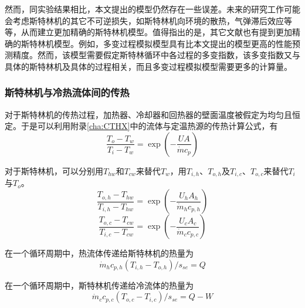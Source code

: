 然而，同实验结果相比，本文提出的模型仍然存在一些误差。未来的研究工作可能会考虑斯特林机的其它不可逆损失，如斯特林机向环境的散热，气弹滞后效应等等，从而建立更加精确的斯特林机模型。值得指出的是，其它文献也有提到更加精确的斯特林机模型。例如，多变过程模拟模型具有比本文提出的模型更高的性能预测精度\cite{Hosseinzade2015, Babaelahi2015}。然而，该模型需要假定斯特林循环中各过程的多变指数，该多变指数又与具体的斯特林机及具体的过程相关，而且多变过程模拟模型需要更多的计算量。

\subsubsection{斯特林机与冷热流体间的传热}

对于斯特林机的传热过程，加热器、冷却器和回热器的壁面温度被假定为均匀且恒定。于是可以利用附录\ref{cha:CTHX}中的流体与定温热源的传热计算公式，有
\begin{equation}
	\frac{T_o-T_w}{T_i-T_w}=\exp(-\frac{UA}{\dot{m}c_p})
\end{equation}

对于斯特林机，可以分别用$T_{hw}$和$T_{cw}$来替代$T_w$，用$T_{i,h}$、$T_{o,h}$及$T_{i,c}$、$T_{o,c}$来替代$T_{i}$与$T_{o}$。
\begin{equation}
	\frac{T_{o,h}-T_{hw}}{T_{i,h}-T_{hw}}=\exp(-\frac{U_hA_h}{\dot{m}_hc_{p,h}})
	\label{eq:T_h}
\end{equation}
\begin{equation}
	\frac{T_{o,c}-T_{cw}}{T_{i,c}-T_{cw}}=\exp(-\frac{U_cA_c}{\dot{m}_cc_{p,c}})
	\label{eq:T_c}
\end{equation}

在一个循环周期中，热流体传递给斯特林机的热量为
\begin{equation}
	\dot{m}_hc_{p,h}(T_{i,h}-T_{o,h})/s_{se} = Q
	\label{eq:q_h}
\end{equation}

在一个循环周期中，斯特林机传递给冷流体的热量为
\begin{equation}
	\dot{m}_cc_{p,c}(T_{o,c}-T_{i,c})/s_{se} = Q - W
	\label{eq:q_c}
\end{equation}


